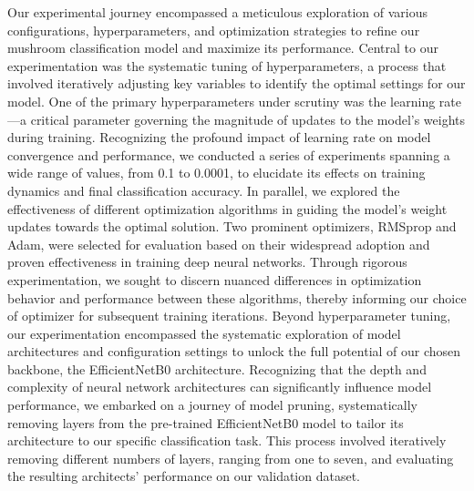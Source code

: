 Our experimental journey encompassed a meticulous exploration of various configurations, hyperparameters, and optimization strategies to refine our mushroom classification model and maximize its performance. Central to our experimentation was the systematic tuning of hyperparameters, a process that involved iteratively adjusting key variables to identify the optimal settings for our model. One of the primary hyperparameters under scrutiny was the learning rate—a critical parameter governing the magnitude of updates to the model’s weights during training. Recognizing the profound impact of learning rate on model convergence and performance, we conducted a series of experiments spanning a wide range of values, from 0.1 to 0.0001, to elucidate its effects on training dynamics and final classification accuracy. In parallel, we explored the effectiveness of different optimization algorithms in guiding the model's weight updates towards the optimal solution. Two prominent optimizers, RMSprop and Adam, were selected for evaluation based on their widespread adoption and proven effectiveness in training deep neural networks. Through rigorous experimentation, we sought to discern nuanced differences in optimization behavior and performance between these algorithms, thereby informing our choice of optimizer for subsequent training iterations. Beyond hyperparameter tuning, our experimentation encompassed the systematic exploration of model architectures and configuration settings to unlock the full potential of our chosen backbone, the EfficientNetB0 architecture. Recognizing that the depth and complexity of neural network architectures can significantly influence model performance, we embarked on a journey of model pruning, systematically removing layers from the pre-trained EfficientNetB0 model to tailor its architecture to our specific classification task. This process involved iteratively removing different numbers of layers, ranging from one to seven, and evaluating the resulting architects' performance on our validation dataset.

